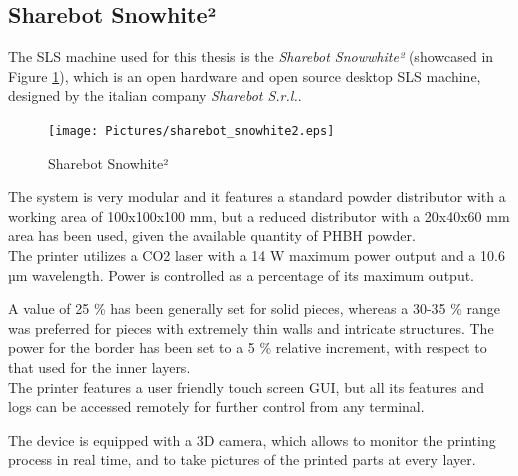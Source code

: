 \documentclass{article}
\begin{document}
          
          \clearpage
  
          \subsection{Sharebot Snowhite²\label{Sharebot_Snowhite²}}
  
          The SLS machine used for this thesis is the \textit{Sharebot Snowwhite²} (showcased in Figure \ref{fig:Sharebot_Snowhite2}), which is an open hardware and 
          open source desktop SLS machine, designed by the italian company \textit{Sharebot S.r.l.}. \\ 
  
          \begin{figure}[ht]
              \centering
              \texttt{[image: Pictures/sharebot\_snowhite2.eps]}
              \caption{Sharebot Snowhite²}
              \label{fig:Sharebot_Snowhite2}
          \end{figure}
  
          The system is very modular and it features a standard powder distributor with a working area of 
          100x100x100 mm, but a reduced distributor with a 20x40x60 mm area has been used, given the available 
          quantity of PHBH powder.  \\ 
  
          The printer utilizes a CO2 laser with a 14 W maximum power output and a 10.6 µm wavelength. Power is controlled as 
          a percentage of its maximum output.  
  
          A value of 25 \% has been generally set for solid pieces, whereas a 30-35 \% range was preferred for pieces with extremely thin walls and intricate structures.  
          The power for the border has been set to a 5 \%  relative increment, with respect to that used for the inner layers. \\ 
  
          The printer features a user friendly touch screen GUI, but all its features and logs can be accessed remotely for further control from any terminal.  
  
          The device is equipped with a 3D camera, which allows to monitor the printing process in real time, 
          and to take pictures of the printed parts at every layer. \\
  
\end{document}
